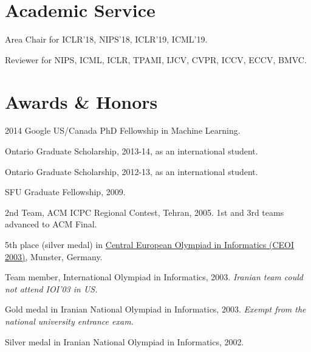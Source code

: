 \documentclass[10pt,letterpaper]{article}
\renewenvironment{itemize}{
  \begin{list}{}{
    \setlength{\leftmargin}{1.5em}
  }
}{
  \end{list}
}
\begin{document}
\section*{Academic Service}

\begin{itemize}

\item Area Chair for ICLR'18, NIPS'18, ICLR'19, ICML'19.

\item Reviewer for NIPS, ICML, ICLR, TPAMI, IJCV, CVPR, ICCV, ECCV, BMVC.
\end{itemize}



\section*{Awards \& Honors}

\begin{itemize}
\item 2014 Google US/Canada PhD Fellowship in Machine Learning.
\item Ontario Graduate Scholarship, 2013-14, as an international student.
\item Ontario Graduate Scholarship, 2012-13, as an international student.
\item SFU Graduate Fellowship, 2009.
\item 2nd Team, ACM ICPC Regional Contest, Tehran, 2005. 1st and 3rd teams advanced to ACM Final.
\item 5th place (silver medal) in \href{http://www.ceoi2003.de/www/}{Central European Olympiad in Informatics (CEOI 2003)}, Munster, Germany.
\item Team member, International Olympiad in Informatics, 2003. {\em Iranian team could not attend IOI'03 in US.}
\item Gold medal in Iranian National Olympiad in Informatics, 2003. {\em Exempt from the national university entrance exam.}
\item Silver medal in Iranian National Olympiad in Informatics, 2002.
\end{itemize}

\end{document}
